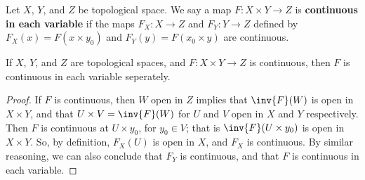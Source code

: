 \begin{definition}
    Let $X$,  $Y$, and  $Z$ be topological space. We say a map  $F: X \times Y
    \rightarrow Z$ is \textbf{continuous in each variable} if the maps $F_X:X
    \rightarrow Z$ and $F_Y:Y \rightarrow Z$ defined by $F_X(x)=F(x \times y_0)$
    and $F_Y(y)=F(x_0 \times y)$ are continuous.
\end{definition}

\begin{lemma}\label{1.7.8}
    If $X$,  $Y$, and  $Z$ are topological spaces, and  $F:X \times Y
    \rightarrow Z$ is continuous, then $F$ is continuous in each variable
    seperately.
\end{lemma}
\begin{proof}
    If $F$ is continuous, then  $W$ open in  $Z$ implies that $\inv{F}(W)$ is
    open in $X \times Y$, and that  $U \times V=\inv{F}(W)$ for $U$ and  $V$
    open in  $X$ and  $Y$ respectively. Then $F$ is continuous at $U \times
    y_0$, for $y_0 \in V$; that is $\inv{F}(U \times y_0)$ is open in $X \times
    Y$. So, by definition,  $F_X(U)$ is open in $X$, and $F_X$ is continuous.
    By similar reasoning, we can also conclude that $F_Y$ is continuous, and
    that $F$ is continuous in each variable.
\end{proof}

